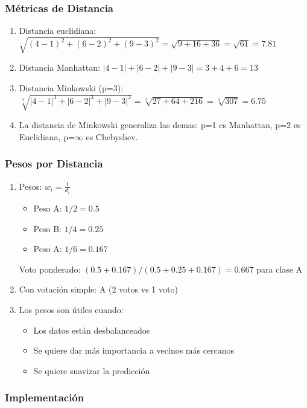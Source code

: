 \documentclass[12pt]{article}
\begin{document}
\subsubsection{Métricas de Distancia}

\begin{enumerate}
    \item Distancia euclidiana: $\sqrt{(4-1)^2 + (6-2)^2 + (9-3)^2} = \sqrt{9 + 16 + 36} = \sqrt{61} = 7.81$
    \item Distancia Manhattan: $|4-1| + |6-2| + |9-3| = 3 + 4 + 6 = 13$
    \item Distancia Minkowski (p=3): $\sqrt[3]{|4-1|^3 + |6-2|^3 + |9-3|^3} = \sqrt[3]{27 + 64 + 216} = \sqrt[3]{307} = 6.75$
    \item La distancia de Minkowski generaliza las demas: p=1 es Manhattan, p=2 es Euclidiana, p=$\infty$ es Chebyshev.
\end{enumerate}

\subsubsection{Pesos por Distancia}

\begin{enumerate}
    \item Pesos: $w_i = \frac{1}{d_i}$
    \begin{itemize}
        \item Peso A: $1/2 = 0.5$
        \item Peso B: $1/4 = 0.25$
        \item Peso A: $1/6 = 0.167$
    \end{itemize}
    Voto ponderado: $(0.5 + 0.167) / (0.5 + 0.25 + 0.167) = 0.667$ para clase A
    \item Con votación simple: A (2 votos vs 1 voto)
    \item Los pesos son útiles cuando:
    \begin{itemize}
        \item Los datos están desbalanceados
        \item Se quiere dar más importancia a vecinos más cercanos
        \item Se quiere suavizar la predicción
    \end{itemize}
\end{enumerate}


\subsubsection{Implementación}
\end{document}
